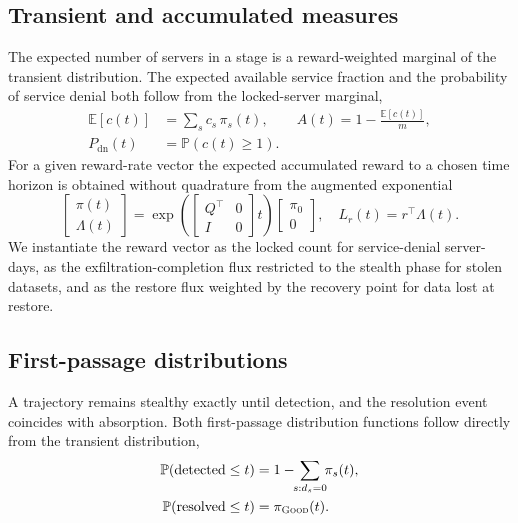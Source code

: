 \documentclass[journal]{IEEEtran}
\newcommand{\E}{\mathbb{E}}
\newcommand{\Prob}{\mathbb{P}}
\begin{document}
\subsection{Transient and accumulated measures}
The expected number of servers in a stage is a reward-weighted marginal of the
transient distribution. The expected available service fraction and the
probability of service denial both follow from the locked-server marginal,
\begin{equation}
\begin{aligned}
\E[c(t)]&=\sum_{s}c_s\,\pi_s(t),\qquad A(t)=1-\frac{\E[c(t)]}{m},\\
P_{\mathrm{dn}}(t)&=\Prob\!\left(c(t)\ge1\right).
\end{aligned}
\label{eq:marginals}
\end{equation}
For a given reward-rate vector the expected accumulated reward to a chosen time
horizon is obtained without quadrature from the
augmented exponential
\begin{equation}
\begin{bmatrix}\pi(t)\\ \Lambda(t)\end{bmatrix}
=\exp\!\left(\begin{bmatrix}Q^\top & 0\\ I & 0\end{bmatrix}t\right)
\begin{bmatrix}\pi_0\\ 0\end{bmatrix},\quad
L_r(t)=r^\top\Lambda(t).
\label{eq:accum}
\end{equation}
We instantiate the reward vector as the locked count for service-denial
server-days, as the exfiltration-completion flux restricted to the stealth phase
for stolen datasets, and as the restore flux weighted by the recovery point for
data lost at restore.

\subsection{First-passage distributions}
A trajectory remains stealthy exactly until detection, and the resolution event
coincides with absorption. Both first-passage distribution functions follow
directly from the transient distribution,
\begin{equation}
\begin{aligned}
\Prob(\text{detected}\le t)&=1-\!\!\sum_{s:d_s=0}\!\!\pi_s(t),\\
\Prob(\text{resolved}\le t)&=\pi_{\textsc{Good}}(t).
\end{aligned}
\label{eq:cdf}
\end{equation}
\end{document}
